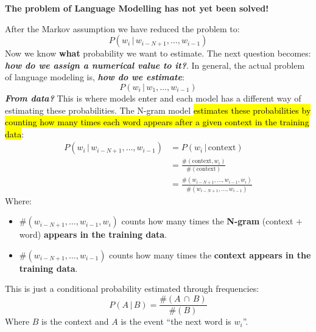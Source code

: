 \begin{flushleft}
    \textcolor{Red2}{ \textbf{The problem of Language Modelling has not yet been solved!}}
\end{flushleft}
After the Markov assumption we have reduced the problem to:
\begin{equation*}
    P\left(w_i \, | \, w_{i-N+1}, \dots, w_{i-1}\right)
\end{equation*}
Now we know \textbf{what} probability we want to estimate. The next question becomes: \emph{\textbf{how do we assign a numerical value to it?}}. In general, the actual problem of language modeling is, \textbf{\emph{how do we estimate}}:
\begin{equation*}
    P\left(w_i \, | \, w_{1}, \dots, w_{i-1}\right)
\end{equation*}
\textbf{\emph{From data?}} This is where models enter and each model has a different way of estimating these probabilities. The N-gram model \hl{estimates these probabilities by counting how many times each word appears after a given context in the training data}:
\begin{equation}\label{eq:ngram-probability-estimation}
    \begin{aligned}
        P\left(w_i \, | \, w_{i-N+1}, \dots, w_{i-1}\right) &= P\left(w_i \, | \, \text{context}\right) \\[.2em]
        &= \frac{\#\left(\text{context}, w_i\right)}{\#\left(\text{context}\right)} \\[.2em]
        &= \frac{\#\left(w_{i-N+1}, \dots, w_{i-1}, w_i\right)}{\#\left(w_{i-N+1}, \dots, w_{i-1}\right)}
    \end{aligned}
\end{equation}
Where:
\begin{itemize}
    \item $\#\left(w_{i-N+1}, \dots, w_{i-1}, w_i\right)$ counts how many times the \textbf{N-gram} (context $+$ word) \textbf{appears in the training data}.
    \item $\#\left(w_{i-N+1}, \dots, w_{i-1}\right)$ counts how many times the \textbf{context appears in the training data}.
\end{itemize}
This is just a conditional probability estimated through frequencies:
\begin{equation*}
    P\left(A \, | \, B\right) = \frac{\#\left(A \, \cap \, B\right)}{\#\left(B\right)}
\end{equation*}
Where $B$ is the context and $A$ is the event ``the next word is $w_i$''.

